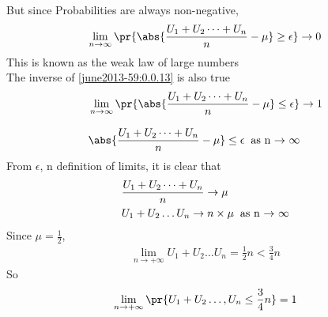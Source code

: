 But since Probabilities are always non-negative,
\begin{align}
    \lim_{n \to \infty} \pr{\abs{\frac{U_1+U_2\dots+U_n}{n} - \mu} \geq \epsilon} \to 0 \label{june2013-59:0.0.13}
\end{align}
This is known as the weak law of large numbers\\
The inverse of \eqref{june2013-59:0.0.13} is also true
\begin{align}
    &\lim_{n \to \infty} \pr{\abs{\frac{U_1+U_2\dots+U_n}{n} - \mu} \leq \epsilon} \to 1 \\[0.3cm]
    &\abs{\frac{U_1+U_2\dots+U_n}{n} - \mu} \leq \epsilon \hspace{0.2cm}\text{as  n $\to$ $\infty$} 
\end{align}
From $\epsilon$, n definition of limits, it is clear that 
\begin{align}
    &\frac{U_1+U_2\dots+U_n}{n} \to \mu\\
    &U_1+U_2\dots U_n \to n\times\mu \hspace{0.2cm}\text{as  n $\to$ $\infty$}
\end{align}
Since $\mu = \frac{1}{2}$,
\begin{align}
    \lim_{n \to +\infty} U_1+U_2\dots U_n = \frac{1}{2}n < \frac{3}{4}n
\end{align}
So 
\begin{align}
    \lim_{n \to +\infty} \pr{U_1+U_2\dots,U_n\leq \frac{3}{4}n} = 1
\end{align}